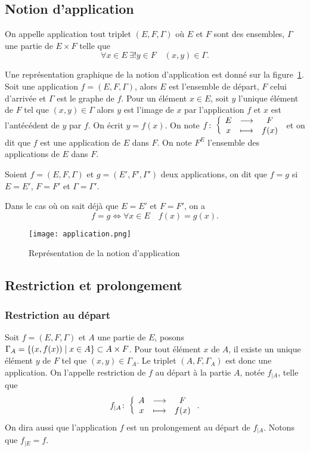 \subsection{Notion d'application}
\label{chap3-subsec:notiondapplication}
\begin{defdef}
  On appelle application tout triplet $(E, F, \Gamma)$ où $E$ et $F$ sont des ensembles, $\Gamma$ une partie de $E \times F$ telle que 
  \begin{equation}
    \forall x \in E \ \exists! y \in F \quad (x,y) \in \Gamma.
  \end{equation}
\end{defdef}
Une représentation graphique de la notion d'application est donné sur la figure~\ref{chap3-fig:application}. Soit une
application $f=(E,F,\Gamma)$, alors $E$ est l'ensemble de départ, $F$ celui d'arrivée et $\Gamma$ est le graphe de $f$.
Pour un élément $x \in E$, soit $y$ l'unique élément de $F$ tel que $(x,y) \in \Gamma$ alors $y$ est l'image de $x$ par
l'application $f$ et $x$ est l'antécédent de $y$ par $f$. On écrit $y=f(x)$. On note $f\colon \left\{\begin{array}{ccc} E & \longrightarrow &F\\ x & \longmapsto & f(x) \end{array} \right.$ et on dit que $f$ est une application de $E$ dans $F$. On note $F^E$ l'ensemble des applications de $E$ dans $F$.
%
\begin{defdef}
  Soient $f=(E,F,\Gamma)$ et $g=(E',F',\Gamma')$ deux applications, on dit que $f=g$ si $E=E'$, $F=F'$ et $\Gamma=\Gamma'$.
\end{defdef}
Dans le cas où on sait déjà que $E=E'$ et $F=F'$, on a
\begin{equation}
  f=g \iff \forall x \in E \quad f(x)=g(x).
\end{equation}
%
\begin{figure}
  \centering
  \texttt{[image: application.png]}
  \caption{Représentation de la notion d'application}
  \label{chap3-fig:application}
\end{figure}
%
\subsection{Restriction et prolongement}
\label{chap3-restrictionetprolongement}
\subsubsection{Restriction au départ} 
\label{chap3-subsubsec:restrictiondep}
Soit $f=(E,F,\Gamma)$ et $A$ une partie de $E$, posons $\Gamma_A=\left\{(x,f(x))\mathrel{}\middle|\mathrel{}x \in A\right\} \subset A \times F$. Pour
tout élément $x$ de $A$, il existe un unique élément $y$ de $F$ tel que $(x,y) \in \Gamma_A$. Le triplet $(A,F, \Gamma_A)$ est donc une application. On l'appelle restriction de $f$ au départ à la partie $A$, notée $f_{|A}$, telle que
\begin{equation}
f_{|A}\colon \left\{\begin{array}{ccc} A & \longrightarrow &F\\ x & \longmapsto & f(x) \end{array} \right..
\end{equation}
On dira aussi que l'application $f$ est un prolongement au départ de $f_{|A}$. Notons que $f_{|E}=f$.
%
